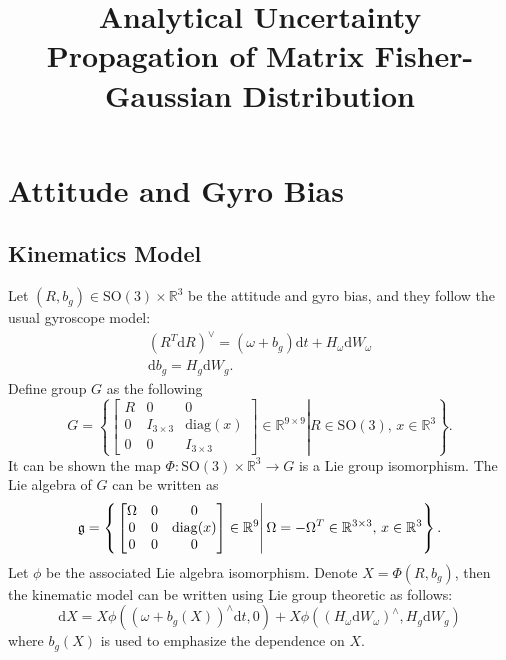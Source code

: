 \documentclass[10pt]{article}
\title{\vspace{-4ex}\textbf{Analytical Uncertainty Propagation of Matrix Fisher-Gaussian Distribution\vspace{-4ex}}}
\date{}
\begin{document}
\maketitle

\section{Attitude and Gyro Bias}

\subsection{Kinematics Model}
Let $(R,b_g)\in\mathrm{SO}(3)\times\mathbb{R}^3$ be the attitude and gyro bias, and they follow the usual gyroscope model:
\begin{gather}
	(R^T\mathrm{d}R)^\vee = (\omega+b_g)\mathrm{d}t + H_\omega\mathrm{d}W_\omega \\
	\mathrm{d}b_g = H_g\mathrm{d}W_g.
\end{gather}
Define group $G$ as the following
\begin{equation}
	G = \left\{\left.\begin{bmatrix}
		R & 0 & 0 \\
		0 & I_{3\times 3} & \mathrm{diag}(x) \\
		0 & 0 & I_{3\times 3}
	\end{bmatrix}\in\mathbb{R}^{9\times 9}\right|R\in\mathrm{SO}(3),\,x\in\mathbb{R}^3\right\}.
\end{equation}
It can be shown the map $\Phi:\mathrm{SO}(3)\times\mathbb{R}^3\to G$ is a Lie group isomorphism.
The Lie algebra of $G$ can be written as
\begin{equation}
	\mathfrak{g} = \left\{\left.\begin{bmatrix}
		\Omega & 0 & 0 \\
		0 & 0 & \mathrm{diag}(x) \\
		0 & 0 & 0
	\end{bmatrix}\in\mathbb{R}^{9\time 9}\right|\Omega=-\Omega^T\in\mathbb{R}^{3\times 3},\,x\in\mathbb{R}^3\right\}.
\end{equation}
Let $\phi$ be the associated Lie algebra isomorphism.
Denote $X=\Phi(R,b_g)$, then the kinematic model can be written using Lie group theoretic as follows:
\begin{equation} \label{eqn:biasSDEinLie}
	\mathrm{d}X = X\phi\left((\omega+b_g(X))^\wedge\mathrm{d}t,0\right) + X\phi\left(\left(H_\omega\mathrm{d}W_\omega\right)^\wedge,H_g\mathrm{d}W_g\right)
\end{equation}
where $b_g(X)$ is used to emphasize the dependence on $X$.
\end{document}
